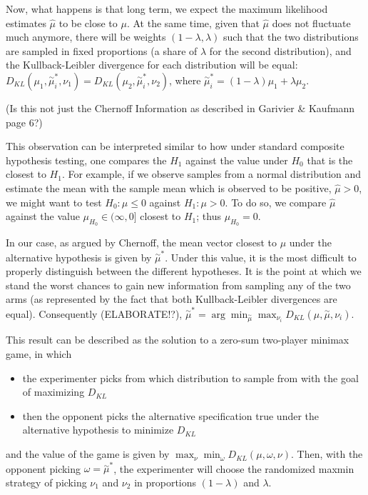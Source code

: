 \documentclass[12pt,]{article}
\providecommand{\tightlist}{%
  \setlength{\itemsep}{0pt}\setlength{\parskip}{0pt}}
\begin{document}
Now, what happens is that long term, we expect the maximum likelihood
estimates \(\hat{\mu}\) to be close to \(\mu\). At the same time, given
that \(\hat{\mu}\) does not fluctuate much anymore, there will be
weights \((1-\lambda, \lambda)\) such that the two distributions are
sampled in fixed proportions (a share of \(\lambda\) for the second
distribution), and the Kullback-Leibler divergence for each distribution
will be equal:
\(D_{KL}(\mu_1, \stackrel{\sim}{\mu}_i^*, \nu_1) = D_{KL}(\mu_2, \stackrel{\sim}{\mu}_i^*, \nu_2)\),
where \(\stackrel{\sim}{\mu}_i^* = (1-\lambda) \mu_1 + \lambda \mu_2\).

(Is this not just the Chernoff Information as described in Garivier \&
Kaufmann page 6?)

This observation can be interpreted similar to how under standard
composite hypothesis testing, one compares the \(H_1\) against the value
under \(H_0\) that is the closest to \(H_1\). For example, if we observe
samples from a normal distribution and estimate the mean with the sample
mean which is observed to be positive, \(\hat{\mu}>0\), we might want to
test \(H_0: \mu \leq 0\) against \(H_1: \mu > 0\). To do so, we compare
\(\hat{\mu}\) against the value \(\mu_{H_0} \in (\infty, 0]\) closest to
\(H_1\); thus \(\mu_{H_0} = 0\).

In our case, as argued by Chernoff, the mean vector closest to \(\mu\)
under the alternative hypothesis is given by \(\stackrel{\sim}{\mu}^*\).
Under this value, it is the most difficult to properly distinguish
between the different hypotheses. It is the point at which we stand the
worst chances to gain new information from sampling any of the two arms
(as represented by the fact that both Kullback-Leibler divergences are
equal). Consequently (ELABORATE!?),
\(\stackrel{\sim}{\mu}^* = \arg \min_{\stackrel{\sim}{\mu}} \max_{\nu_i} D_{KL}(\mu, \stackrel{\sim}{\mu}, \nu_i)\).

This result can be described as the solution to a zero-sum two-player
minimax game, in which

\begin{itemize}
\tightlist
\item
  the experimenter picks from which distribution to sample from with the
  goal of maximizing \(D_{KL}\)
\item
  then the opponent picks the alternative specification true under the
  alternative hypothesis to minimize \(D_{KL}\)
\end{itemize}

and the value of the game is given by
\(\max_{\nu} \min_{\omega} D_{KL}(\mu, \omega, \nu)\). Then, with the
opponent picking \(\omega = \stackrel{\sim}{\mu}^*\), the experimenter
will choose the randomized maxmin strategy of picking \(\nu_1\) and
\(\nu_2\) in proportions \((1-\lambda)\) and \(\lambda\).
\end{document}
